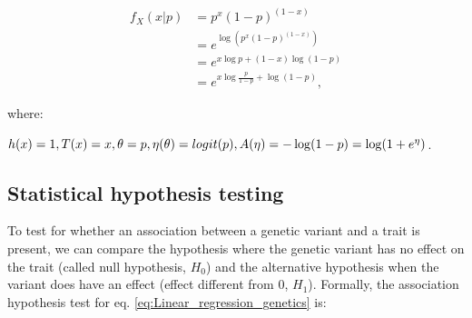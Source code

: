 \begin{Comment}

\begin{equation*}
\begin{split}
    f_X(x|p) & = p^x(1-p)^{(1-x)}\\
         & = e^{\log (p^x(1-p)^{(1-x)})}\\
         & = e^{x\log p + (1-x)\log (1-p)}\\
         & = e^{x\log \frac{p}{1-p}+\log (1-p)},
\end{split}
\end{equation*}

where: 

$h(x)=1, \hfill T(x)=x, \hfill \theta = p, \hfill \eta(\theta) = logit(p), \hfill A(\eta) = - \log(1-p) = \log (1+e^{\eta})$. 
\hfill


\end{Comment}


\newpage



\subsection{Statistical hypothesis testing}
\label{sec:hypothesis_testing}

To test for whether an association between a genetic variant and a trait is present, we can compare the hypothesis where the genetic variant has no effect on the trait (called null hypothesis, $H_0$) and the alternative hypothesis when the variant does have an effect (effect different from $0$,  $H_1$).
Formally, the association hypothesis test for eq. \eqref{eq:Linear_regression_genetics} is:

